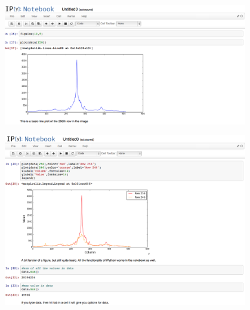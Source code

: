 \begin{figure}[ht!]
  \centering
    \includegraphics[width=0.95\textwidth]{notebook4.png}
\end{figure}

\begin{figure}[ht!]
  \centering
    \includegraphics[width=0.95\textwidth]{notebook5.png}
\end{figure}



